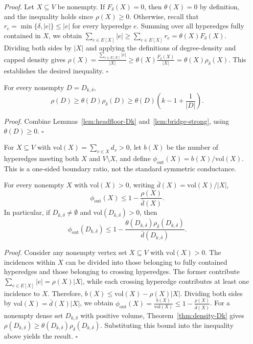 \documentclass[twocolumn]{svjour3}
\begin{document}
\emph{Proof.}
Let $X\subseteq V$ be nonempty. If $F_\delta(X)=0$,
then $\theta(X)=0$ by definition, and the inequality holds
since $\rho(X)\ge 0$.
Otherwise, recall that $r_e=\min\{\delta,|e|\}\le |e|$
for every hyperedge $e$. Summing over all hyperedges
fully contained in $X$, we obtain
$\sum_{e\in E[X]}|e|
\ge \sum_{e\in E[X]}r_e
=\theta(X)F_\delta(X)$.
Dividing both sides by $|X|$ and applying the definitions
of degree-density and capped density gives
$\rho(X)
=\frac{\sum_{e\in E[X]}|e|}{|X|}
\ge \theta(X)\frac{F_\delta(X)}{|X|}
=\theta(X)\rho_\delta(X)$.
This establishes the desired inequality.
\hfill$\square$

\begin{theorem}\label{thm:density-Dk}
For every nonempty $D=D_{k,\delta}$,
\[
 \rho(D)\ge\theta(D)\rho_\delta(D)
       \ge\theta(D)\left(k-1+\frac{1}{|D|}\right).
\]
\end{theorem}
\emph{Proof.} Combine Lemmas~\ref{lem:headfloor-Dk} and~\ref{lem:bridge-strong}, using $\theta(D)\ge0$. \hfill$\square$

\begin{definition}\label{def:one-sided}
For $X\subseteq V$ with $\mathrm{vol}(X)=\sum_{v\in X}d_v>0$, let $b(X)$ be the number of hyperedges meeting both $X$ and $V\setminus X$, and define $\phi_{\mathrm{out}}(X)=b(X)/\mathrm{vol}(X)$. This is a one-sided boundary ratio, not the standard symmetric conductance.
\end{definition}
\begin{theorem}\label{thm:cond}
For every nonempty $X$ with $\mathrm{vol}(X)>0$, writing $\bar d(X)=\mathrm{vol}(X)/|X|$,
\[
 \phi_{\mathrm{out}}(X)\le 1-\frac{\rho(X)}{\bar d(X)}.
\]
In particular, if $D_{k,\delta}\ne\emptyset$ and $\mathrm{vol}(D_{k,\delta})>0$, then
\[
 \phi_{\mathrm{out}}(D_{k,\delta})\le
 1-\frac{\theta(D_{k,\delta})\rho_\delta(D_{k,\delta})}{\bar d(D_{k,\delta})}.
\]
\end{theorem}
\emph{Proof.}
Consider any nonempty vertex set $X\subseteq V$ with $\mathrm{vol}(X)>0$. The incidences within $X$ can be divided into those belonging to fully contained hyperedges and those belonging to crossing hyperedges. The former contribute $\sum_{e\in E[X]}|e|=\rho(X)|X|$, while each crossing hyperedge contributes at least one incidence to $X$. Therefore,
$b(X)\le \mathrm{vol}(X)-\rho(X)|X|$.
Dividing both sides by $\mathrm{vol}(X)=\bar d(X)|X|$, we obtain
$\phi_{\mathrm{out}}(X)
=\frac{b(X)}{\mathrm{vol}(X)}
\le 1-\frac{\rho(X)}{\bar d(X)}$.
For a nonempty dense set $D_{k,\delta}$ with positive volume, Theorem~\ref{thm:density-Dk} gives
$\rho(D_{k,\delta})\ge\theta(D_{k,\delta})\rho_\delta(D_{k,\delta})$.
Substituting this bound into the inequality above yields the result.
\hfill$\square$
\end{document}
